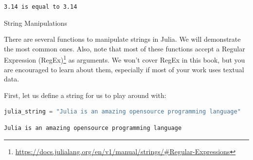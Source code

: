 \documentclass[
  notoc %
]{tufte-book}
\makeatletter
\DeclareRobustCommand{\href}[2]{#2\footnote{\url{#1}}}
\renewcommand\subsubsection{%
\@startsection{subsubsection}{3}{\z@ }{-3.25ex\@plus -1ex \@minus -.2ex}{1.5ex \@plus .2ex}{\normalfont \normalsize \bfseries }
}
\makeatother
\begin{document}
\begin{lstlisting}[language=Output]
3.14 is equal to 3.14
\end{lstlisting}

\hypertarget{sec:string_manipulations}{%
\subsubsection{String Manipulations}\label{sec:string_manipulations}}

There are several functions to manipulate strings in Julia. We will
demonstrate the most common ones. Also, note that most of these
functions accept a
\href{https://docs.julialang.org/en/v1/manual/strings/\#Regular-Expressions}{Regular
Expression (RegEx)} as arguments. We won't cover RegEx in this book, but
you are encouraged to learn about them, especially if most of your work
uses textual data.

First, let us define a string for us to play around with:

\begin{lstlisting}[language=Julia]
julia_string = "Julia is an amazing opensource programming language"
\end{lstlisting}

\begin{lstlisting}[language=Output]
Julia is an amazing opensource programming language
\end{lstlisting}
\end{document}
